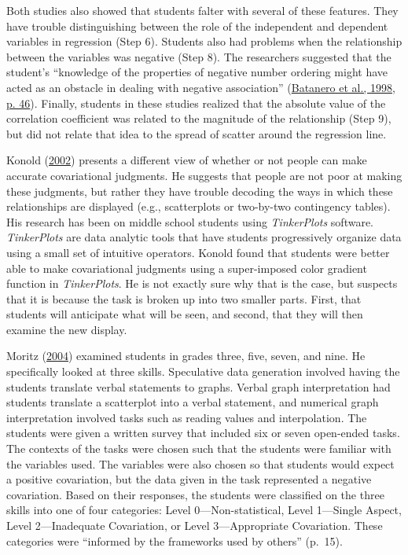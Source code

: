 \documentclass[11pt]{umnthesis}
\begin{document}
Both studies also showed that students falter with several of these features. They have trouble distinguishing between the role of the independent and dependent variables in regression (Step 6). Students also had problems when the relationship between the variables was negative (Step 8). The researchers suggested that the student's ``knowledge of the properties of negative number ordering might have acted as an obstacle in dealing with negative association'' (\protect\hyperlink{ref-batanero:1998}{Batanero et al., 1998, p. 46}). Finally, students in these studies realized that the absolute value of the correlation coefficient was related to the magnitude of the relationship (Step 9), but did not relate that idea to the spread of scatter around the regression line.

Konold (\protect\hyperlink{ref-konold:2002}{2002}) presents a different view of whether or not people can make accurate covariational judgments. He suggests that people are not poor at making these judgments, but rather they have trouble decoding the ways in which these relationships are displayed (e.g., scatterplots or two-by-two contingency tables). His research has been on middle school students using \emph{TinkerPlots} software. \emph{TinkerPlots} are data analytic tools that have students progressively organize data using a small set of intuitive operators. Konold found that students were better able to make covariational judgments using a super-imposed color gradient function in \emph{TinkerPlots}. He is not exactly sure why that is the case, but suspects that it is because the task is broken up into two smaller parts. First, that students will anticipate what will be seen, and second, that they will then examine the new display.

Moritz (\protect\hyperlink{ref-moritz:2004}{2004}) examined students in grades three, five, seven, and nine. He specifically looked at three skills. Speculative data generation involved having the students translate verbal statements to graphs. Verbal graph interpretation had students translate a scatterplot into a verbal statement, and numerical graph interpretation involved tasks such as reading values and interpolation. The students were given a written survey that included six or seven open-ended tasks. The contexts of the tasks were chosen such that the students were familiar with the variables used. The variables were also chosen so that students would expect a positive covariation, but the data given in the task represented a negative covariation. Based on their responses, the students were classified on the three skills into one of four categories: Level 0---Non-statistical, Level 1---Single Aspect, Level 2---Inadequate Covariation, or Level 3---Appropriate Covariation. These categories were ``informed by the frameworks used by others'' (p.~15).
\end{document}
